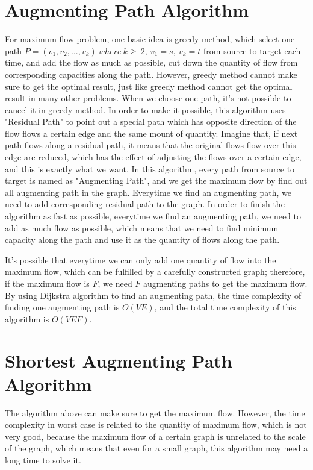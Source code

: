 \documentclass[twocolumn,9pt]{extarticle}
\begin{document}
\section{Augmenting Path Algorithm}
For maximum flow problem, one basic idea is greedy method, which select one path $P=(v_1, v_2, ..., v_k)\ where\ k\geq\ 2,\ v_1=s,\ v_k=t$ from source to target each time, and add the flow as much as possible, cut down the quantity of flow from corresponding capacities along the path. However, greedy method cannot make sure to get the optimal result, just like greedy method cannot get the optimal result in many other problems. When we choose one path, it's not possible to cancel it in greedy method. In order to make it possible, this algorithm uses "Residual Path" to point out a special path which has opposite direction of the flow flows a certain edge and the same mount of quantity. Imagine that, if next path flows along a residual path, it means that the original flows flow over this edge are reduced, which has the effect of adjusting the flows over a certain edge, and this is exactly what we want. In this algorithm, every path from source to target is named as "Augmenting Path", and we get the maximum flow by find out all augmenting path in the graph. Everytime we find an augmenting path, we need to add corresponding residual path to the graph. In order to finish the algorithm as fast as possible, everytime we find an augmenting path, we need to add as much flow as possible, which means that we need to find minimum capacity along the path and use it as the quantity of flows along the path.

It's possible that everytime we can only add one quantity of flow into the maximum flow, which can be fulfilled by a carefully constructed graph; therefore, if the maximum flow is $F$, we need $F$ augmenting paths to get the maximum flow. By using Dijkstra algorithm to find an augmenting path, the time complexity of finding one augmenting path is $O(VE)$, and the total time complexity of this algorithm is $O(VEF)$.

\section{Shortest Augmenting Path Algorithm}
The algorithm above can make sure to get the maximum flow. However, the time complexity in worst case is related to the quantity of maximum flow, which is not very good, because the maximum flow of a certain graph is unrelated to the scale of the graph, which means that even for a small graph, this algorithm may need a long time to solve it.
\end{document}
